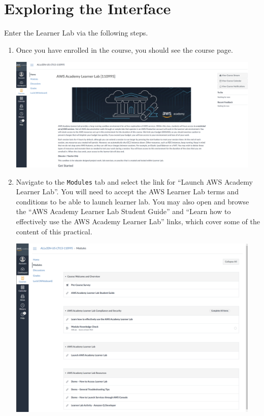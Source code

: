\documentclass{csse4400}
\begin{document}
\section{Exploring the Interface}

Enter the Learner Lab via the following steps.

\begin{enumerate}

\item Once you have enrolled in the course, you should see the course page.

\includegraphics[trim=0 200 0 0,clip,width=0.95\textwidth]{images/academy-homepage}

\item Navigate to the \texttt{Modules} tab and select the link for ``Launch AWS Academy Learner Lab''.
        You will need to accept the AWS Learner Lab terms and conditions to be able to launch learner lab.
        You may also open and browse the ``AWS Academy Learner Lab Student Guide'' and
        ``Learn how to effectively use the AWS Academy Learner Lab'' links, which cover some of the content of this practical.

\includegraphics[width=0.95\textwidth]{images/modules-page}


\end{enumerate}
\end{document}
